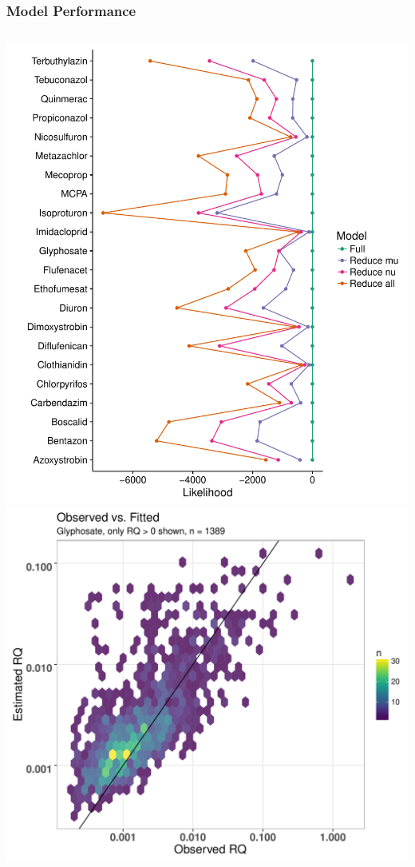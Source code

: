 \documentclass[
	12pt
	]{beamer}
\begin{document}
\begin{frame}
	\frametitle{Model Performance}
	\begin{columns}[T]
		\includegraphics[width =1.1\textwidth]{figs/logliks.pdf}
		\includegraphics[width =1.1\textwidth]{figs/pftdvsobs.pdf}
	\end{columns}
\end{frame}
\end{document}
